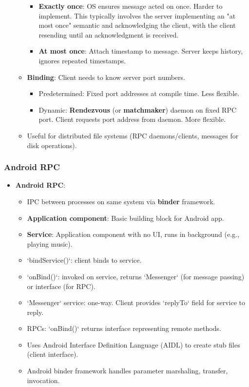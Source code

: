 \begin{itemize}
\begin{itemize}
\begin{itemize}
                    \item \textbf{Exactly once}: OS ensures message acted on once. Harder to implement. This typically involves the server implementing an "at most once" semantic and acknowledging the client, with the client resending until an acknowledgment is received.
                    \item \textbf{At most once}: Attach timestamp to message. Server keeps history, ignores repeated timestamps.
                \end{itemize}
            \item \textbf{Binding}: Client needs to know server port numbers.
                \begin{itemize}
                    \item Predetermined: Fixed port addresses at compile time. Less flexible.
                    \item Dynamic: \textbf{Rendezvous} (or \textbf{matchmaker}) daemon on fixed RPC port. Client requests port address from daemon. More flexible.
                \end{itemize}
            \item Useful for distributed file systems (RPC daemons/clients, messages for disk operations).
        \end{itemize}
\end{itemize}

\subsubsection{Android RPC}
\begin{itemize}
    \item \textbf{Android RPC}:
        \begin{itemize}
            \item IPC between processes on same system via \textbf{binder} framework.
            \item \textbf{Application component}: Basic building block for Android app.
            \item \textbf{Service}: Application component with no UI, runs in background (e.g., playing music).
            \item `bindService()`: client binds to service.
            \item `onBind()`: invoked on service, returns `Messenger` (for message passing) or interface (for RPC).
            \item `Messenger` service: one-way. Client provides `replyTo` field for service to reply.
            \item RPCs: `onBind()` returns interface representing remote methods.
            \item Uses Android Interface Definition Language (AIDL) to create stub files (client interface).
            \item Android binder framework handles parameter marshaling, transfer, invocation.
        \end{itemize}
\end{itemize}
